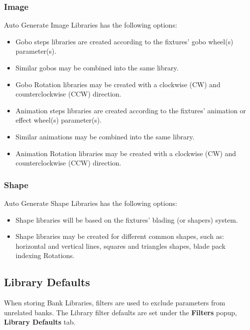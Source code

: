 \documentclass[
]{article}
\begin{document}
\hypertarget{image-1}{%
\subsubsection{Image}\label{image-1}}

Auto Generate Image Libraries has the following options:

\begin{itemize}
\item
  Gobo steps libraries are created according to the fixtures' gobo wheel(s) parameter(s).
\item
  Similar gobos may be combined into the same library.
\item
  Gobo Rotation libraries may be created with a clockwise (CW) and counterclockwise (CCW) direction.
\item
  Animation steps libraries are created according to the fixtures' animation or effect wheel(s) parameter(s).
\item
  Similar animations may be combined into the same library.
\item
  Animation Rotation libraries may be created with a clockwise (CW) and counterclockwise (CCW) direction.
\end{itemize}

\hypertarget{shape-1}{%
\subsubsection{Shape}\label{shape-1}}

Auto Generate Shape Libraries has the following options:

\begin{itemize}
\item
  Shape libraries will be based on the fixtures' blading (or shapers) system.
\item
  Shape libraries may be created for different common shapes, such as: horizontal and vertical lines, squares and triangles shapes, blade pack indexing Rotations.
\end{itemize}

\hypertarget{Library-Defaults-8.3}{%
\subsection{Library Defaults}\label{Library-Defaults-8.3}}

When storing Bank Libraries, filters are used to exclude parameters from unrelated banks. The Library filter defaults are set under the \textbf{Filters} popup, \textbf{Library Defaults} tab.
\end{document}
